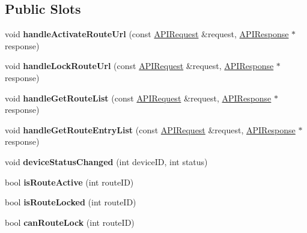 \subsection*{Public Slots}
\begin{DoxyCompactItemize}
\item 
\mbox{\label{class_a_p_i_route_a23f1b30a95e806760968daf23e2b3fa1}} 
void {\bfseries handle\+Activate\+Route\+Url} (const \hyperlink{class_a_p_i_request}{A\+P\+I\+Request} \&request, \hyperlink{class_a_p_i_response}{A\+P\+I\+Response} $\ast$response)
\item 
\mbox{\label{class_a_p_i_route_a2edf94cf41f8fba5b1ed5f5eca217968}} 
void {\bfseries handle\+Lock\+Route\+Url} (const \hyperlink{class_a_p_i_request}{A\+P\+I\+Request} \&request, \hyperlink{class_a_p_i_response}{A\+P\+I\+Response} $\ast$response)
\item 
\mbox{\label{class_a_p_i_route_a62f9b2e4addb8b60087a02a3e93c1abf}} 
void {\bfseries handle\+Get\+Route\+List} (const \hyperlink{class_a_p_i_request}{A\+P\+I\+Request} \&request, \hyperlink{class_a_p_i_response}{A\+P\+I\+Response} $\ast$response)
\item 
\mbox{\label{class_a_p_i_route_a95f38f3fb39801deba8d4a39e14686d2}} 
void {\bfseries handle\+Get\+Route\+Entry\+List} (const \hyperlink{class_a_p_i_request}{A\+P\+I\+Request} \&request, \hyperlink{class_a_p_i_response}{A\+P\+I\+Response} $\ast$response)
\item 
\mbox{\label{class_a_p_i_route_a345f0a966a94e0915f324aa19f9fb41f}} 
void {\bfseries device\+Status\+Changed} (int device\+ID, int status)
\item 
\mbox{\label{class_a_p_i_route_afbd5b3b86ddacee31d16330de4d069df}} 
bool {\bfseries is\+Route\+Active} (int route\+ID)
\item 
\mbox{\label{class_a_p_i_route_a78e979b1ae56db76fb77de3cb8e54da9}} 
bool {\bfseries is\+Route\+Locked} (int route\+ID)
\item 
\mbox{\label{class_a_p_i_route_ab02063d3a9335d9e3e3ad9160dbb626b}} 
bool {\bfseries can\+Route\+Lock} (int route\+ID)
\end{DoxyCompactItemize}
